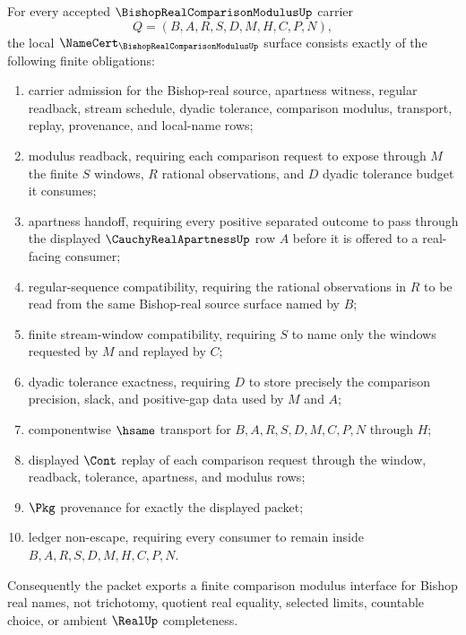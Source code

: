 \begin{theorem}
\label{thm:bishop-real-comparison-modulus-namecert-obligations}
For every accepted $\BishopRealComparisonModulusUp$ carrier
$$
Q=(B,A,R,S,D,M,H,C,P,N),
$$
the local $\NameCert_{\BishopRealComparisonModulusUp}$ surface consists exactly of the following finite obligations:
\begin{enumerate}
\item carrier admission for the Bishop-real source, apartness witness, regular readback, stream schedule, dyadic tolerance, comparison modulus, transport, replay, provenance, and local-name rows;
\item modulus readback, requiring each comparison request to expose through $M$ the finite $S$ windows, $R$ rational observations, and $D$ dyadic tolerance budget it consumes;
\item apartness handoff, requiring every positive separated outcome to pass through the displayed $\CauchyRealApartnessUp$ row $A$ before it is offered to a real-facing consumer;
\item regular-sequence compatibility, requiring the rational observations in $R$ to be read from the same Bishop-real source surface named by $B$;
\item finite stream-window compatibility, requiring $S$ to name only the windows requested by $M$ and replayed by $C$;
\item dyadic tolerance exactness, requiring $D$ to store precisely the comparison precision, slack, and positive-gap data used by $M$ and $A$;
\item componentwise $\hsame$ transport for $B,A,R,S,D,M,C,P,N$ through $H$;
\item displayed $\Cont$ replay of each comparison request through the window, readback, tolerance, apartness, and modulus rows;
\item $\Pkg$ provenance for exactly the displayed packet;
\item ledger non-escape, requiring every consumer to remain inside $B,A,R,S,D,M,H,C,P,N$.
\end{enumerate}
Consequently the packet exports a finite comparison modulus interface for Bishop real names, not trichotomy, quotient real equality, selected limits, countable choice, or ambient $\RealUp$ completeness.
\end{theorem}
